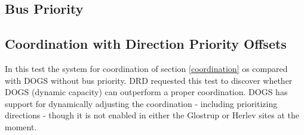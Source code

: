 \subsection*{Bus Priority}


\subsection{Coordination with Direction Priority Offsets}
In this test the system for coordination of section \ref{coordination} os compared with DOGS without bus priority. DRD requested this test to discover whether DOGS (dynamic capacity) can outperform a proper coordination. DOGS has support for dynamically adjusting the coordination - including prioritizing directions - though it is not enabled in either the Glostrup or Herlev sites at the moment.

